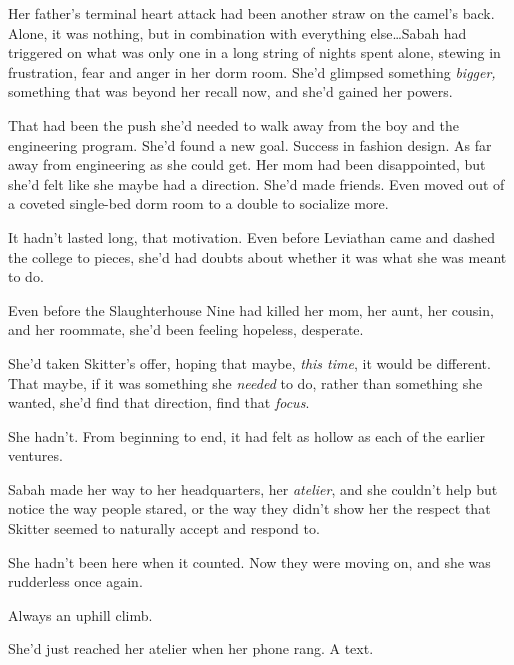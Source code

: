 Her father's terminal heart attack had been another straw on the camel's back.  Alone, it was nothing, but in combination with everything else\ldots Sabah had triggered on what was only one in a long string of nights spent alone, stewing in frustration, fear and anger in her dorm room.  She'd glimpsed something \emph{bigger, }something that was beyond her recall now, and she'd gained her powers.



That had been the push she'd needed to walk away from the boy and the engineering program.  She'd found a new goal.  Success in fashion design.  As far away from engineering as she could get.  Her mom had been disappointed, but she'd felt like she maybe had a direction.  She'd made friends.  Even moved out of a coveted single-bed dorm room to a double to socialize more.



It hadn't lasted long, that motivation.  Even before Leviathan came and dashed the college to pieces, she'd had doubts about whether it was what she was meant to do.



Even before the Slaughterhouse Nine had killed her mom, her aunt, her cousin, and her roommate, she'd been feeling hopeless, desperate.



She'd taken Skitter's offer, hoping that maybe, \emph{this time}, it would be different.  That maybe, if it was something she \emph{needed} to do, rather than something she wanted, she'd find that direction, find that \emph{focus}.



She hadn't.  From beginning to end, it had felt as hollow as each of the earlier ventures.



Sabah made her way to her headquarters, her \emph{atelier}, and she couldn't help but notice the way people stared, or the way they didn't show her the respect that Skitter seemed to naturally accept and respond to.



She hadn't been here when it counted.  Now they were moving on, and she was rudderless once again.



Always an uphill climb.



She'd just reached her atelier when her phone rang.  A text.



